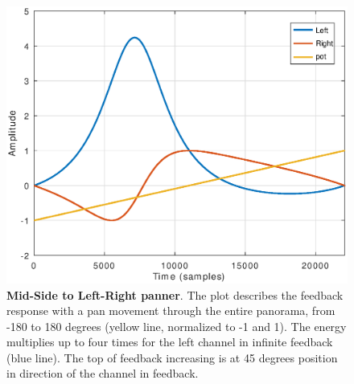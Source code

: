 \begin{figure}[t]
\centering
\includegraphics[width=1\columnwidth]{CAPITOLI/1000/IMG/mspanlrfbpot}
\caption{\textbf{Mid-Side to Left-Right panner}. The plot describes the feedback
response with a pan movement through the entire panorama, from -180 to 180
degrees (yellow line, normalized to -1 and 1). The energy multiplies up to four
times for the left channel in infinite feedback (blue line). The top of feedback
increasing is at 45 degrees position in direction of the channel in feedback.}
\label{fig:mspanlrfb}
\end{figure}
